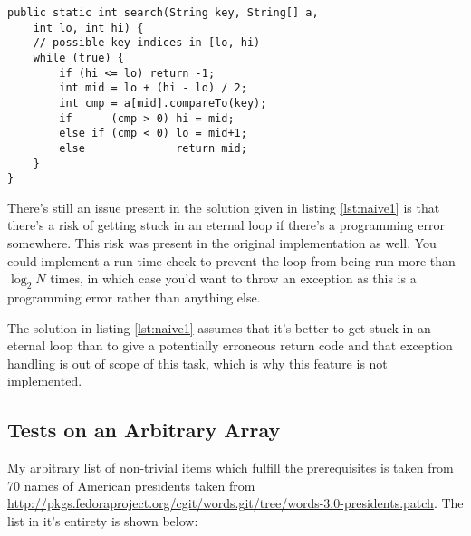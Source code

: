 \documentclass[a4paper,11pt]{article}
\begin{document}
\begin{lstlisting}[caption={Non-recursive version of the binary search}, label=lst:naive1]
public static int search(String key, String[] a, 
	int lo, int hi) {                                                         
    // possible key indices in [lo, hi)                                                                                    
    while (true) {                                                                                                         
        if (hi <= lo) return -1;                                                                                           
        int mid = lo + (hi - lo) / 2;                                                                                      
        int cmp = a[mid].compareTo(key);                                                                                   
        if      (cmp > 0) hi = mid;                                                                                        
        else if (cmp < 0) lo = mid+1;                                                                                      
        else              return mid;                                                                                      
    }                                                                                                                      
} 
\end{lstlisting}

There's still an issue present in the solution given in listing \ref{lst:naive1} is that there's a risk of getting stuck in an eternal loop if there's a programming error somewhere. This risk was present in the original implementation as well. You could implement a run-time check to prevent the loop from being run more than $\log_{2}{N}$ times, in which case you'd want to throw an exception as this is a programming error rather than anything else.

The solution in listing \ref{lst:naive1} assumes that it's better to get stuck in an eternal loop than to give a potentially erroneous return code and that exception handling is out of scope of this task, which is why this feature is not implemented.

\subsection{Tests on an Arbitrary Array}
My arbitrary list of non-trivial items which fulfill the prerequisites is taken from 70 names of American presidents taken from \url{http://pkgs.fedoraproject.org/cgit/words.git/tree/words-3.0-presidents.patch}. The list in it's entirety is shown below:
\end{document}
